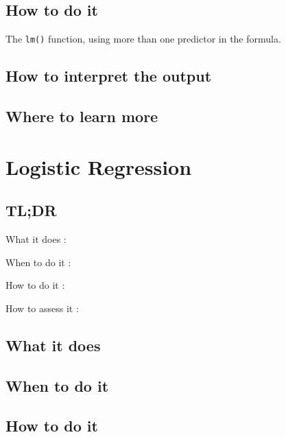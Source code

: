 \documentclass[
]{book}
\begin{document}
\hypertarget{how-to-do-it-1}{%
\section{How to do it}\label{how-to-do-it-1}}

The \texttt{lm()} function, using more than one predictor in the formula.

\hypertarget{how-to-interpret-the-output-1}{%
\section{How to interpret the output}\label{how-to-interpret-the-output-1}}

\hypertarget{where-to-learn-more-1}{%
\section{Where to learn more}\label{where-to-learn-more-1}}

\hypertarget{logistic-regression}{%
\chapter{Logistic Regression}\label{logistic-regression}}

\hypertarget{tldr-2}{%
\section{TL;DR}\label{tldr-2}}

What it does
:

When to do it
:

How to do it
:

How to assess it
:

\hypertarget{what-it-does-2}{%
\section{What it does}\label{what-it-does-2}}

\hypertarget{when-to-do-it-2}{%
\section{When to do it}\label{when-to-do-it-2}}

\hypertarget{how-to-do-it-2}{%
\section{How to do it}\label{how-to-do-it-2}}
\end{document}
